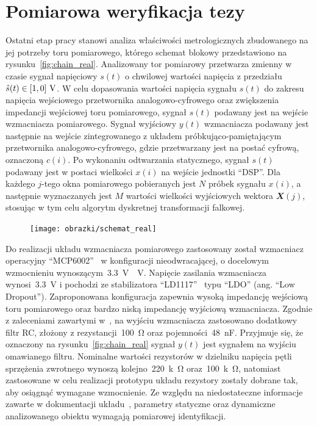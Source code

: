 \chapter{Pomiarowa weryfikacja tezy}

Ostatni etap pracy stanowi analiza właściwości metrologicznych zbudowanego na jej potrzeby toru pomiarowego, którego schemat blokowy przedstawiono na rysunku~\ref{fig:chain_real}. Analizowany tor pomiarowy przetwarza zmienny w czasie sygnał napięciowy $s(t)$ o chwilowej wartości napięcia z przedziału $\hat{s}(t) \in \interval{1}{0}~\unit{V}$. W celu dopasowania wartości napięcia sygnału $s(t)$ do zakresu napięcia wejściowego przetwornika analogowo-cyfrowego oraz zwiększenia impedancji wejściowej toru pomiarowego, sygnał $s(t)$ podawany jest na wejście wzmacniacza pomiarowego. Sygnał wyjściowy $y(t)$ wzmacniacza podawany jest następnie na wejście zintegrowanego z układem próbkująco-pamiętającym przetwornika analogowo-cyfrowego, gdzie przetwarzany jest na postać cyfrową, oznaczoną $c(i)$. Po wykonaniu odtwarzania statycznego, sygnał $s(t)$ podawany jest w postaci wielkości $x(i)$ na wejście jednostki \enquote{DSP}. Dla każdego $j$-tego okna pomiarowego pobieranych jest $N$ próbek sygnału $x(i)$, a następnie wyznaczanych jest $M$ wartości wielkości wyjściowych wektora $\mathbfit{X}(j)$, stosując w tym celu algorytm dyskretnej transformacji falkowej.

\begin{figure}[htb!]
\begin{center}
\texttt{[image: obrazki/schemat\_real]}
\end{center}
\end{figure}

Do realizacji układu wzmacniacza pomiarowego zastosowany został wzmacniacz operacyjny \enquote{MCP6002}~\cite{microchip_manual} w konfiguracji nieodwracającej, o docelowym wzmocnieniu wynoszącym~\qty{3.3}{V \per V}. Napięcie zasilania wzmacniacza wynosi~\qty{3.3}{V} i pochodzi ze stabilizatora \enquote{LD1117}~\cite{stm_manual} typu \enquote{LDO} (ang. \enquote{Low Dropout}). Zaproponowana konfiguracja zapewnia wysoką impedancję wejściową toru pomiarowego oraz bardzo niską impedancję wyjściową wzmacniacza. Zgodnie z zaleceniami zawartymi w~\cite{baker_sar, microchip_application}, na wyjściu wzmacniacza zastosowano dodatkowy filtr RC, złożony z rezystancji~\qty{100}{\ohm} oraz pojemności~\qty{48}{nF}. Przyjmuje się, że oznaczony na rysunku~\ref{fig:chain_real} sygnał $y(t)$ jest sygnałem na wyjściu omawianego filtru. Nominalne wartości rezystorów w dzielniku napięcia pętli sprzężenia zwrotnego wynoszą kolejno~\qty{220}{k \ohm} oraz~\qty{100}{k \ohm}, natomiast zastosowane w celu realizacji prototypu układu rezystory zostały dobrane tak, aby osiągnąć wymagane wzmocnienie. Ze względu na niedostateczne informacje zawarte w dokumentacji układu~\cite{microchip_manual}, parametry statyczne oraz dynamiczne analizowanego obiektu wymagają pomiarowej identyfikacji.

